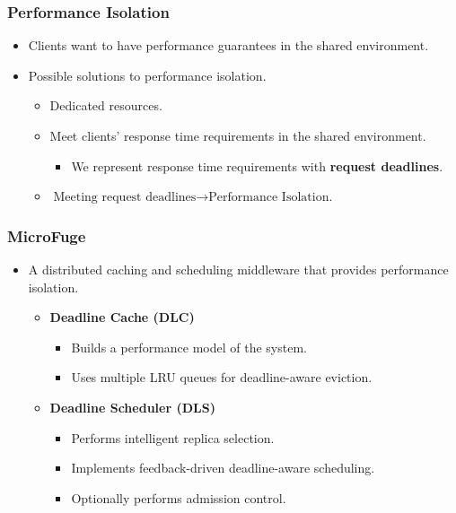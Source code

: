 \documentclass{beamer}
\newcommand{\myv}{\vspace{3 mm}}
\begin{document}
\begin{frame}
  \frametitle{Performance Isolation}
  \begin{itemize}
  \item Clients want to have performance guarantees in the shared
    environment. \myv
  \item Possible solutions to performance isolation.
    \myv
    \begin{itemize}
    \item Dedicated resources.
      \myv
    \item Meet clients' response time requirements in the shared environment.
      \myv
      \begin{itemize}
      \item We represent response time requirements with \textbf{request deadlines}.
      \end{itemize}
      \myv
    \item \(\text{Meeting request deadlines} \rightarrow \text{Performance Isolation.}\)
    \end{itemize}
  \end{itemize}
\end{frame}

\begin{frame}
  \frametitle{MicroFuge}
  \begin{itemize}
  \item A distributed caching and scheduling middleware that provides
    performance isolation.
    \myv
  \begin{itemize}
  \item \textbf{Deadline Cache (DLC)}
    \myv
      \begin{itemize}
      \item Builds a performance model of the system.
        \myv
      \item Uses multiple LRU queues for deadline-aware eviction.
        \myv
      \end{itemize}
    \item \textbf{Deadline Scheduler (DLS)}
      \begin{itemize}
        \myv
      \item Performs intelligent replica selection.
        \myv
      \item Implements feedback-driven deadline-aware scheduling.
        \myv
      \item Optionally performs admission control.
      \end{itemize}
  \end{itemize}
  \end{itemize}
\end{frame}
\end{document}
